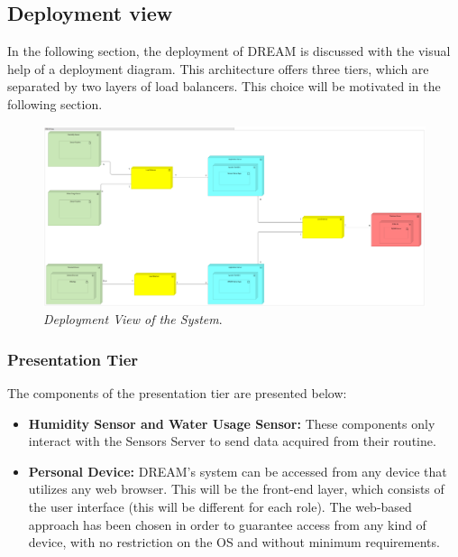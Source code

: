 \subsection{Deployment view}
In the following section, the deployment of DREAM is discussed with the visual help of a deployment diagram. This architecture offers three tiers, which are separated by two layers of load balancers. This choice will be motivated in the following section.\\
\begin{figure}[H]
    \centering
    \includegraphics[width=\textwidth]{Images/DeploymentView.png}
    \caption{\textit{Deployment View of the System}.}
\end{figure}
\subsubsection{Presentation Tier}
The components of the presentation tier are presented below:
\begin{itemize}
    \item \textbf{Humidity Sensor and Water Usage Sensor: }These components only interact with the Sensors Server to send data acquired from their routine.
    \item \textbf{Personal Device: }DREAM’s system can be accessed from any device that utilizes any web browser. This will be the front-end layer, which consists of the user interface (this will be different for each role). The web-based approach has been chosen in order to guarantee access from any kind of device, with no restriction on the OS and without minimum requirements.
\end{itemize}
